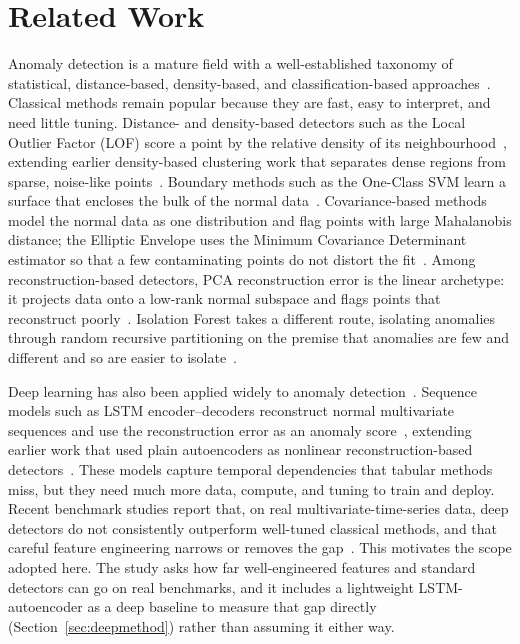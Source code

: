 \documentclass[runningheads]{llncs}
\begin{document}
\section{Related Work}
\label{sec:related}
Anomaly detection is a mature field with a well-established taxonomy of
statistical, distance-based, density-based, and classification-based
approaches~\cite{chandola2009}. Classical methods remain popular because they are
fast, easy to interpret, and need little tuning. Distance- and density-based
detectors such as the Local Outlier Factor (LOF) score a point by the relative
density of its neighbourhood~\cite{breunig2000}, extending earlier density-based
clustering work that separates dense regions from sparse, noise-like
points~\cite{ester1996}. Boundary methods such as the
One-Class SVM learn a surface that encloses the bulk of the normal
data~\cite{scholkopf2001}. Covariance-based methods model the normal data as one
distribution and flag points with large Mahalanobis distance; the Elliptic
Envelope uses the Minimum Covariance Determinant estimator so that a few
contaminating points do not distort the fit~\cite{rousseeuw1999}. Among
reconstruction-based detectors, PCA reconstruction error is the linear
archetype: it projects data onto a low-rank normal subspace and flags points
that reconstruct poorly~\cite{shyu2003}. Isolation Forest takes a different
route, isolating anomalies through random recursive partitioning on the premise
that anomalies are few and different and so are easier to isolate~\cite{liu2008}.

Deep learning has also been applied widely to anomaly
detection~\cite{chalapathy2019}. Sequence models such as LSTM encoder--decoders
reconstruct normal multivariate sequences and use the reconstruction error as an
anomaly score~\cite{malhotra2016}, extending earlier work that used plain
autoencoders as nonlinear reconstruction-based detectors~\cite{sakurada2014}.
These models capture temporal dependencies
that tabular methods miss, but they need much more data, compute, and tuning to
train and deploy. Recent benchmark studies report that, on real
multivariate-time-series data, deep detectors do not consistently outperform
well-tuned classical methods, and that careful feature engineering narrows or
removes the gap~\cite{belay2023,chalapathy2019}. This motivates the scope
adopted here. The study asks how far well-engineered features and standard
detectors can go on real benchmarks, and it includes a lightweight
LSTM-autoencoder as a deep baseline to measure that gap directly
(Section~\ref{sec:deepmethod}) rather than assuming it either way.
\end{document}

